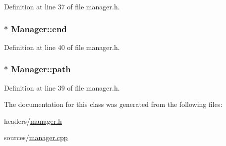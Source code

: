 Definition at line 37 of file manager.\-h.

\hypertarget{class_manager_aec87028a71ab7b031977ac12a086658d}{
\subsubsection[{end}]{$\ast$ Manager\-::end}}\label{class_manager_aec87028a71ab7b031977ac12a086658d}


Definition at line 40 of file manager.\-h.

\hypertarget{class_manager_ad9b3bf0343fe49922b1874dcb2b5c6ca}{
\subsubsection[{path}]{$\ast$ Manager\-::path}}\label{class_manager_ad9b3bf0343fe49922b1874dcb2b5c6ca}


Definition at line 39 of file manager.\-h.



The documentation for this class was generated from the following files\-:\begin{DoxyCompactItemize}
\item 
headers/\hyperlink{manager_8h}{manager.\-h}\item 
sources/\hyperlink{manager_8cpp}{manager.\-cpp}\end{DoxyCompactItemize}
